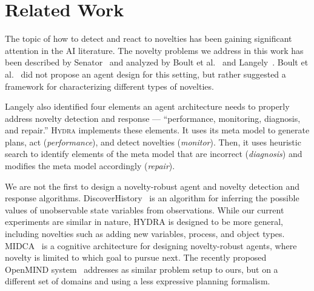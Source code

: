 \documentclass[letterpaper]{article} %
\newcommand{\hydra}{\textsc{Hydra}\xspace} %
\begin{document}





\section{Related Work}

The topic of how to detect and react to novelties has been gaining significant attention in the AI literature. 
The novelty problems we address in this work has been described by Senator~\cite{senator2019sailon} 
and analyzed by Boult et al.~\cite{boult2021towards}
and Langely~\cite{langley2020open}. 
Boult et al.~\cite{boult2021towards,langley2020open} did not propose an agent design for this setting, but rather suggested a framework for characterizing different types of novelties. 


Langely also identified four elements an agent architecture needs to properly address novelty detection and response --- ``performance, monitoring, diagnosis, and repair.'' 
\hydra implements these elements. 
It uses its meta model to generate plans, act (\emph{performance}), and detect novelties (\emph{monitor}). 
Then, it uses heuristic search to identify elements of the meta model that are incorrect (\emph{diagnosis}) and modifies the meta model accordingly (\emph{repair}). 

We are not the first to design a novelty-robust agent and novelty detection and response algorithms. DiscoverHistory~\cite{molineaux2012discoverhistory} is an algorithm for inferring the possible values of unobservable state variables from observations. While our current experiments are similar in nature, HYDRA is designed to be more general, including novelties such as adding new variables, process, and object types. MIDCA~\cite{paisner2014goal} is a cognitive architecture for designing novelty-robust agents, where novelty is limited to which goal to pursue next. The recently proposed OpenMIND system~\cite{musliner2021openmind} addresses as similar problem setup to ours, but on a different set of domains and using a less expressive planning formalism. 


\end{document}

